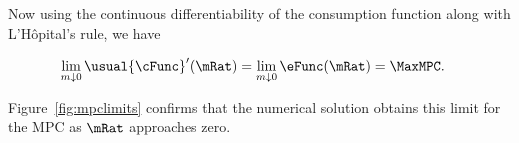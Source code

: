 \documentclass[BufferStockTheory]{subfiles}
\begin{document}
Now using the continuous differentiability of the consumption function
along with L'H\^opital's rule, we have
\begin{comment}
  \begin{align*}
    \eFunc^{\prime}(\mRat)  & = \mRat^{-1} \usual{\cFunc}^{\prime}(\mRat) - \mRat^{-2} \usual{\cFunc}(\mRat)
    \\ \mRat \eFunc^{\prime}(\mRat)  & = \usual{\cFunc}^{\prime}(\mRat) - \usual{\cFunc}(\mRat)/\mRat
    \\ \usual{\cFunc}^{\prime}(\mRat)  & = \eFunc(\mRat)+ \mRat \eFunc^{\prime}(\mRat)
  \end{align*}
  and since $0<\eFunc(\mRat)<1$ we have
\end{comment}
\begin{align*}
  \lim_{m \downarrow 0} \usual{\cFunc}^{\prime}(\mRat)  & = \lim_{m \downarrow 0}
                                                  \eFunc(\mRat) = \MaxMPC. 
\end{align*}

Figure~\ref{fig:mpclimits} confirms that the numerical solution obtains this limit for the MPC as $\mRat$ approaches zero.
\end{document}
